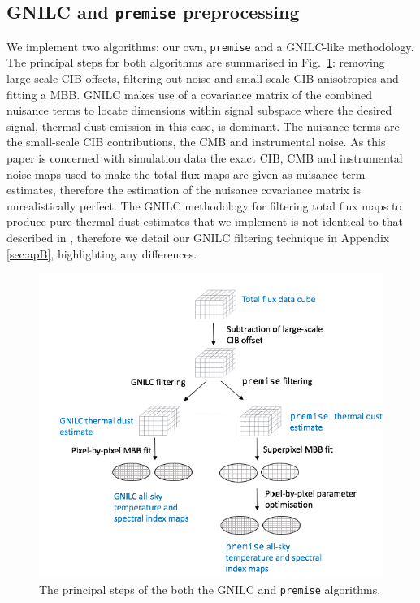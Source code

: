 \documentclass[a4paper,fleqn,usenatbib]{mnras}
\begin{document}
\subsection{GNILC and {\texttt{premise}} preprocessing}

We implement two algorithms: our own, {\texttt{premise}} and a GNILC-like methodology. The principal steps for both algorithms are summarised in Fig.~\ref{fig:methFlo}: removing large-scale CIB offsets, filtering out noise and small-scale CIB anisotropies and fitting a MBB. GNILC makes use of a covariance matrix of the combined nuisance terms to locate dimensions within signal subspace where the desired signal, thermal dust emission in this case, is dominant. The nuisance terms are the small-scale CIB contributions, the CMB and instrumental noise. As this paper is concerned with simulation data the exact CIB, CMB and instrumental noise maps used to make the total flux maps are given as nuisance term estimates, therefore the estimation of the nuisance covariance matrix is unrealistically perfect. The GNILC methodology for filtering total flux maps to produce pure thermal dust estimates that we implement is not identical to that described in \citet{gnilc}, therefore we detail our GNILC filtering technique in Appendix \ref{sec:apB}, highlighting any differences. 

\begin{figure}
\centering
\includegraphics[width=0.99\linewidth]{methodDiagram}
\caption{The principal steps of the both the GNILC and {\texttt{premise}} algorithms.}
\label{fig:methFlo}
\end{figure}
\end{document}
